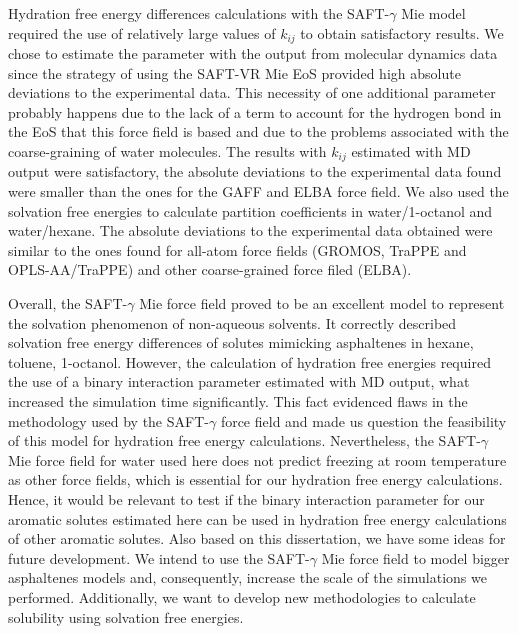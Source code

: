 Hydration free energy differences calculations with the SAFT-$\gamma$ Mie model required the use of relatively large values of $k_{ij}$ to obtain satisfactory results. We chose to estimate the parameter with the output from molecular dynamics data since the strategy of using the SAFT-VR Mie EoS provided high absolute deviations to the experimental data. This necessity of one additional parameter probably happens due to the lack of a term to account for the hydrogen bond in the EoS that this force field is based and due to the problems associated with the coarse-graining of water molecules. The results with $k_{ij}$ estimated with MD output were satisfactory, the absolute deviations to the experimental data found were smaller than the ones for the GAFF and ELBA force field. We also used the solvation free energies to calculate partition coefficients in water/1-octanol and water/hexane. The absolute deviations to the experimental data obtained were similar to the ones found for all-atom force fields (GROMOS, TraPPE and OPLS-AA/TraPPE) and other coarse-grained force filed (ELBA).

Overall, the SAFT-$\gamma$ Mie force field proved to be an excellent model to represent the solvation phenomenon of non-aqueous solvents. It correctly described solvation free energy differences of solutes mimicking asphaltenes in hexane, toluene, 1-octanol. However, the calculation of hydration free energies required the use of a binary interaction parameter estimated with MD output, what increased the simulation time significantly. This fact evidenced flaws in the methodology used by the SAFT-$\gamma$ force field and made us question the feasibility of this model for hydration free energy calculations. Nevertheless, the SAFT-$\gamma$ Mie force field for water used here does not predict freezing at room temperature as other force fields, which is essential for our hydration free energy calculations. Hence, it would be relevant to test if the binary interaction parameter for our aromatic solutes estimated here can be used in hydration free energy calculations of other aromatic solutes. Also based on this dissertation, we have some ideas for future development. We intend to use the SAFT-$\gamma$ Mie force field to model bigger asphaltenes models and, consequently, increase the scale of the simulations we performed. Additionally, we want to develop new methodologies to calculate solubility using solvation free energies.


